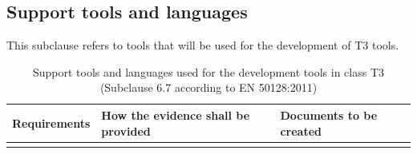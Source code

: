 \documentclass{template/openetcs_report}
\begin{document}
\subsection{Support tools and languages}
\begin{flushleft}
This subclause refers to tools that will be used for the development of T3 tools.
\end{flushleft}
{\footnotesize\sffamily\centering
\begin{longtable}{|p{2cm}|p{9cm}|p{3cm}|}
\caption{Support tools and languages used for the development tools in class T3 (Subclause 6.7 according to EN 50128:2011)}\\
\hline
\bfseries Requirements & \bfseries How the evidence shall be provided & \bfseries Documents to be created\\
\hline
\hline
\endhead
\hline
\endfoot


\end{longtable}}
\end{document}
